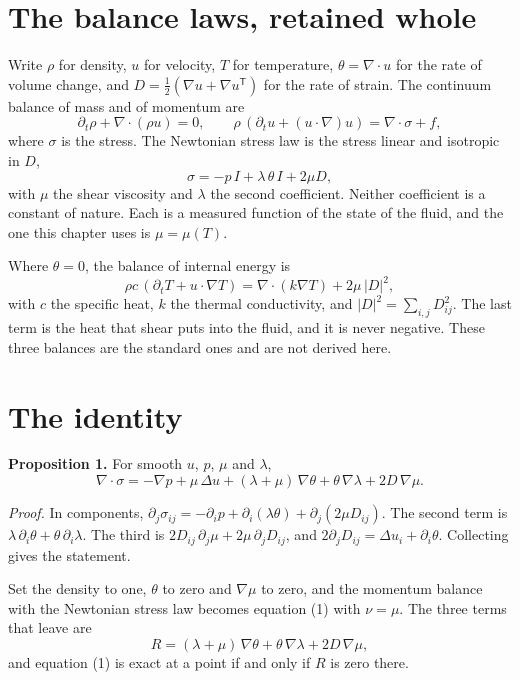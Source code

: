 \section{The balance laws, retained whole}

Write $\rho$ for density, $u$ for velocity, $T$ for temperature, $\theta = \nabla\cdot u$ for the
rate of volume change, and $D = \tfrac12(\nabla u + \nabla u^{\mathsf T})$ for the rate of strain.
The continuum balance of mass and of momentum are
\[
\partial_t\rho + \nabla\cdot(\rho u) = 0,
\qquad
\rho\,(\partial_t u + (u\cdot\nabla)u) = \nabla\cdot\sigma + f,
\]
where $\sigma$ is the stress. The Newtonian stress law is the stress linear and isotropic in $D$,
\[
\sigma = -p\,I + \lambda\,\theta\,I + 2\mu D,
\]
with $\mu$ the shear viscosity and $\lambda$ the second coefficient. Neither coefficient is a
constant of nature. Each is a measured function of the state of the fluid, and the one this
chapter uses is $\mu = \mu(T)$.

Where $\theta = 0$, the balance of internal energy is
\[
\rho c\,(\partial_t T + u\cdot\nabla T) = \nabla\cdot(k\nabla T) + 2\mu\,|D|^2,
\]
with $c$ the specific heat, $k$ the thermal conductivity, and $|D|^2 = \sum_{i,j} D_{ij}^2$. The
last term is the heat that shear puts into the fluid, and it is never negative. These three balances
are the standard ones and are not derived here.

\section{The identity}

\textbf{Proposition 1.} For smooth $u$, $p$, $\mu$ and $\lambda$,
\[
\nabla\cdot\sigma = -\nabla p + \mu\,\Delta u + (\lambda+\mu)\,\nabla\theta + \theta\,\nabla\lambda
+ 2D\,\nabla\mu .
\]

\emph{Proof.} In components,
$\partial_j\sigma_{ij} = -\partial_i p + \partial_i(\lambda\theta) + \partial_j(2\mu D_{ij})$.
The second term is $\lambda\,\partial_i\theta + \theta\,\partial_i\lambda$. The third is
$2D_{ij}\,\partial_j\mu + 2\mu\,\partial_j D_{ij}$, and
$2\partial_j D_{ij} = \Delta u_i + \partial_i\theta$. Collecting gives the statement.
\hfill\qedsymbol

Set the density to one, $\theta$ to zero and $\nabla\mu$ to zero, and the momentum balance with the
Newtonian stress law becomes equation (1) with $\nu = \mu$. The three terms that leave are
\[
R = (\lambda+\mu)\,\nabla\theta + \theta\,\nabla\lambda + 2D\,\nabla\mu ,
\]
and equation (1) is exact at a point if and only if $R$ is zero there.

